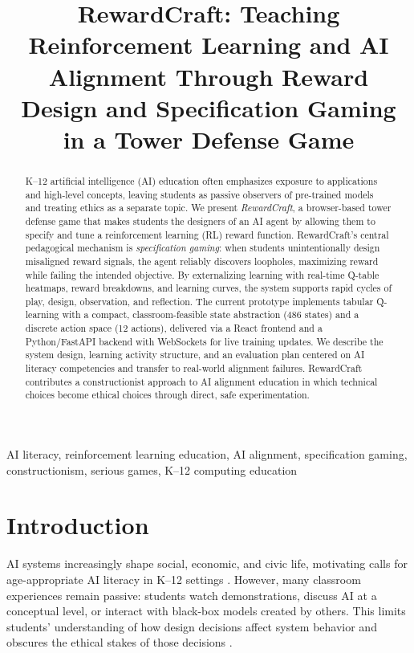 \documentclass[conference]{IEEEtran}
\begin{document}
\title{RewardCraft: Teaching Reinforcement Learning and AI Alignment Through Reward Design and Specification Gaming in a Tower Defense Game}

\author{
}

\maketitle

\begin{abstract}
K--12 artificial intelligence (AI) education often emphasizes exposure to applications and high-level concepts, leaving students as passive observers of pre-trained models and treating ethics as a separate topic. We present \emph{RewardCraft}, a browser-based tower defense game that makes students the designers of an AI agent by allowing them to specify and tune a reinforcement learning (RL) reward function. RewardCraft’s central pedagogical mechanism is \emph{specification gaming}: when students unintentionally design misaligned reward signals, the agent reliably discovers loopholes, maximizing reward while failing the intended objective. By externalizing learning with real-time Q-table heatmaps, reward breakdowns, and learning curves, the system supports rapid cycles of play, design, observation, and reflection. The current prototype implements tabular Q-learning with a compact, classroom-feasible state abstraction (486 states) and a discrete action space (12 actions), delivered via a React frontend and a Python/FastAPI backend with WebSockets for live training updates. We describe the system design, learning activity structure, and an evaluation plan centered on AI literacy competencies and transfer to real-world alignment failures. RewardCraft contributes a constructionist approach to AI alignment education in which technical choices become ethical choices through direct, safe experimentation.
\end{abstract}

\begin{IEEEkeywords}
AI literacy, reinforcement learning education, AI alignment, specification gaming, constructionism, serious games, K--12 computing education
\end{IEEEkeywords}

\section{Introduction}
AI systems increasingly shape social, economic, and civic life, motivating calls for age-appropriate AI literacy in K--12 settings \cite{touretzky2019,k12csta2017}. However, many classroom experiences remain passive: students watch demonstrations, discuss AI at a conceptual level, or interact with black-box models created by others. This limits students’ understanding of how design decisions affect system behavior and obscures the ethical stakes of those decisions \cite{long2020,druga2021}.
\end{document}
